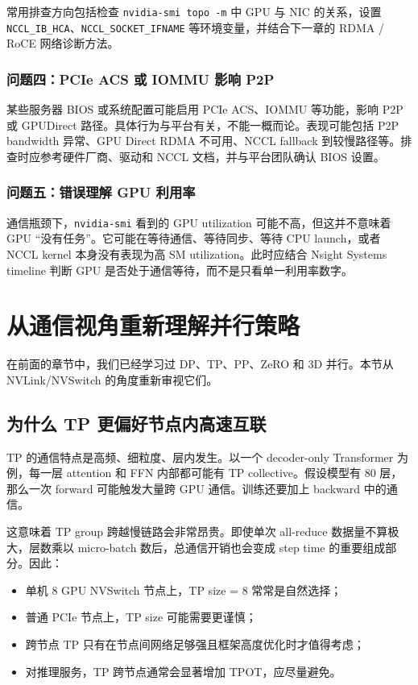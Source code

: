 常用排查方向包括检查 \texttt{nvidia-smi topo -m} 中 GPU 与 NIC 的关系，设置 \texttt{NCCL\_IB\_HCA}、\texttt{NCCL\_SOCKET\_IFNAME} 等环境变量，并结合下一章的 RDMA / RoCE 网络诊断方法。

\subsubsection{问题四：PCIe ACS 或 IOMMU 影响 P2P}

某些服务器 BIOS 或系统配置可能启用 PCIe ACS、IOMMU 等功能，影响 P2P 或 GPUDirect 路径。具体行为与平台有关，不能一概而论。表现可能包括 P2P bandwidth 异常、GPU Direct RDMA 不可用、NCCL fallback 到较慢路径等。排查时应参考硬件厂商、驱动和 NCCL 文档，并与平台团队确认 BIOS 设置。

\subsubsection{问题五：错误理解 GPU 利用率}

通信瓶颈下，\texttt{nvidia-smi} 看到的 GPU utilization 可能不高，但这并不意味着 GPU “没有任务”。它可能在等待通信、等待同步、等待 CPU launch，或者 NCCL kernel 本身没有表现为高 SM utilization。此时应结合 Nsight Systems timeline 判断 GPU 是否处于通信等待，而不是只看单一利用率数字。

\section{从通信视角重新理解并行策略}
\label{sec:parallelism-from-communication}

在前面的章节中，我们已经学习过 DP、TP、PP、ZeRO 和 3D 并行。本节从 NVLink/NVSwitch 的角度重新审视它们。

\subsection{为什么 TP 更偏好节点内高速互联}
\label{subsec:tp-prefers-intranode}

TP 的通信特点是高频、细粒度、层内发生。以一个 decoder-only Transformer 为例，每一层 attention 和 FFN 内部都可能有 TP collective。假设模型有 80 层，那么一次 forward 可能触发大量跨 GPU 通信。训练还要加上 backward 中的通信。

这意味着 TP group 跨越慢链路会非常昂贵。即使单次 all-reduce 数据量不算极大，层数乘以 micro-batch 数后，总通信开销也会变成 step time 的重要组成部分。因此：

\begin{itemize}
  \item 单机 8 GPU NVSwitch 节点上，TP size = 8 常常是自然选择；
  \item 普通 PCIe 节点上，TP size 可能需要更谨慎；
  \item 跨节点 TP 只有在节点间网络足够强且框架高度优化时才值得考虑；
  \item 对推理服务，TP 跨节点通常会显著增加 TPOT，应尽量避免。
\end{itemize}

